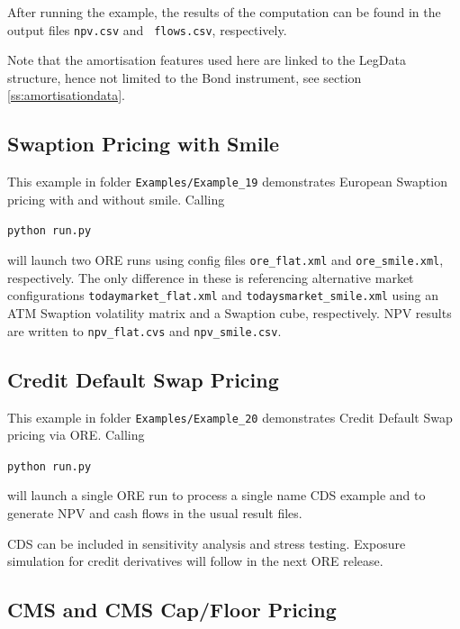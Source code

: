 \documentclass[12pt, a4paper]{article}
\begin{document}
After running the example, the results of the computation can be found in the output files {\tt npv.csv} and {\tt
  flows.csv}, respectively.

\medskip
Note that the amortisation features used here are linked to the LegData structure, hence not limited to the Bond instrument, see section \ref{ss:amortisationdata}.

\subsection{Swaption Pricing with Smile}%

This example in folder {\tt Examples/Example\_19} demonstrates European Swaption pricing with and without smile. Calling

\medskip
\centerline{\tt python run.py}

\medskip
will launch two ORE runs using config files {\tt ore\_flat.xml} and {\tt ore\_smile.xml}, respectively. The only difference in these is referencing alternative market configurations {\tt todaymarket\_flat.xml} and {\tt todaysmarket\_smile.xml} using an ATM Swaption volatility matrix and a Swaption cube, respectively. NPV results are written to {\tt npv\_flat.cvs} and {\tt npv\_smile.csv}.

\subsection{Credit Default Swap Pricing}%

This example in folder {\tt Examples/Example\_20} demonstrates Credit Default Swap pricing via ORE. Calling

\medskip
\centerline{\tt python run.py}

\medskip
will launch a single ORE run to process a single name CDS example and to generate NPV and cash flows in the usual result files. 

\medskip
CDS can be included in sensitivity analysis and stress testing. Exposure simulation for credit derivatives will follow in the next ORE release.

\subsection{CMS and CMS Cap/Floor Pricing}%
\end{document}
